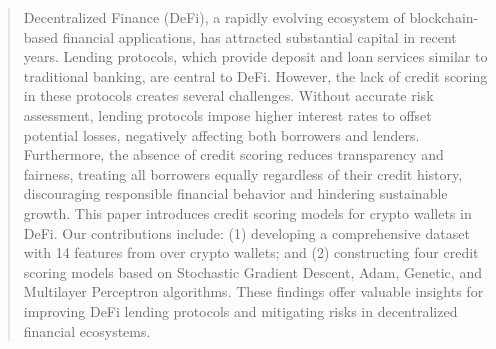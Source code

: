 \documentclass[runningheads]{llncs}
\begin{document}
\begin{abstract}
Decentralized Finance (DeFi), a rapidly evolving ecosystem of blockchain-based financial applications, has attracted substantial capital in recent years. Lending protocols, which provide deposit and loan services similar to traditional banking, are central to DeFi. However, the lack of credit scoring in these protocols creates several challenges. Without accurate risk assessment, lending protocols impose higher interest rates to offset potential losses, negatively affecting both borrowers and lenders. Furthermore, the absence of credit scoring reduces transparency and fairness, treating all borrowers equally regardless of their credit history, discouraging responsible financial behavior and hindering sustainable growth. This paper introduces credit scoring models for crypto wallets in DeFi. Our contributions include: (1) developing a comprehensive dataset with 14 features from over  crypto wallets; and (2) constructing four credit scoring models based on Stochastic Gradient Descent, Adam, Genetic, and Multilayer Perceptron algorithms. These findings offer valuable insights for improving DeFi lending protocols and mitigating risks in decentralized financial ecosystems.


\end{abstract}
\end{document}
